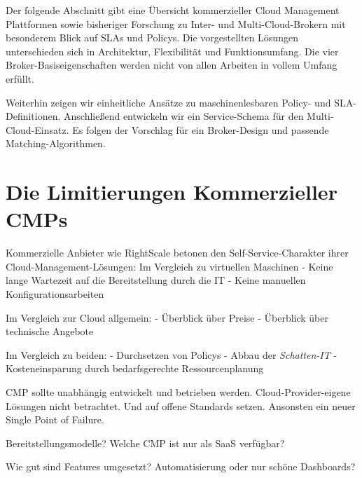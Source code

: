 \noindent
Der folgende Abschnitt gibt eine Übersicht kommerzieller Cloud Management Plattformen sowie bisheriger Forschung zu Inter- und Multi-Cloud-Brokern mit besonderem Blick auf SLAs und Policys. Die vorgestellten Lösungen unterschieden sich in Architektur, Flexibilität und Funktionsumfang. Die vier Broker-Basiseigenschaften werden nicht von allen Arbeiten in vollem Umfang erfüllt.

Weiterhin zeigen wir einheitliche Ansätze zu maschinenlesbaren Policy- und SLA-Definitionen. Anschließend entwickeln wir ein Service-Schema für den Multi-Cloud-Einsatz. Es folgen der Vorschlag für ein Broker-Design und passende Matching-Algorithmen.

\section{Die Limitierungen Kommerzieller CMPs}

Kommerzielle Anbieter wie RightScale betonen den Self-Service-Charakter ihrer Cloud-Management-Lösungen: 
Im Vergleich zu virtuellen Maschinen
- Keine lange Wartezeit auf die Bereitstellung durch die IT
- Keine manuellen Konfigurationsarbeiten

Im Vergleich zur Cloud allgemein:
- Überblick über Preise
- Überblick über technische Angebote

Im Vergleich zu beiden:
- Durchsetzen von Policys
- Abbau der \emph{Schatten-IT}
- Kosteneinsparung durch bedarfsgerechte Ressourcenplanung



CMP sollte unabhängig entwickelt und betrieben werden. Cloud-Provider-eigene Lösungen nicht betrachtet. Und auf offene Standards setzen. Ansonsten ein neuer Single Point of Failure.


Bereitstellungsmodelle? Welche CMP ist nur als SaaS verfügbar?

Wie gut sind Features umgesetzt? Automatisierung oder nur schöne Dashboards?


